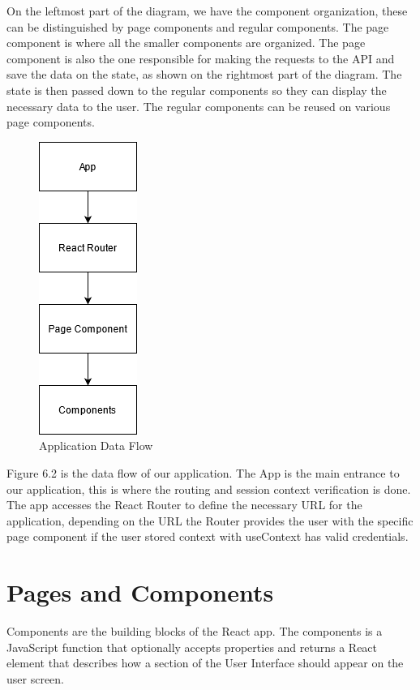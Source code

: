 \documentclass[a4paper,twoside,10pt]{report}
\begin{document}
On the leftmost part of the diagram, we have the component organization, these can be distinguished by page components and regular components.
The page component is where all the smaller components are organized. 
\newline
The page component is also the one responsible for making the requests to the API and save the data on the state, as shown on the rightmost part of the diagram.
\newline
The state is then passed down to the regular components so they can display the necessary data to the user.
The regular components can be reused on various page components.

\newpage
\begin{figure}[h!]
\center
  \includegraphics{client app interations.png}
\caption{Application Data Flow}
\end{figure}
Figure 6.2 is the data flow of our application.
The App is the main entrance to our application, this is where the routing and session context verification is done.
The app accesses the React Router to define the necessary URL for the application, depending on the URL the Router provides the user with the specific page component if the user stored context with useContext has valid credentials.

\section{Pages and Components}
Components are the building blocks of the React app. The components is a JavaScript function that optionally accepts properties and returns a React element that describes how a section of the User Interface should appear on the user screen. 
\end{document}
